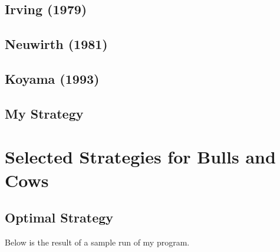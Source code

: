\subsection{Irving (1979)}

\subsection{Neuwirth (1981)}

\subsection{Koyama (1993)}

\subsection{My Strategy}

\section{Selected Strategies for Bulls and Cows}

\subsection{Optimal Strategy}

Below is the result of a sample run of my program.

